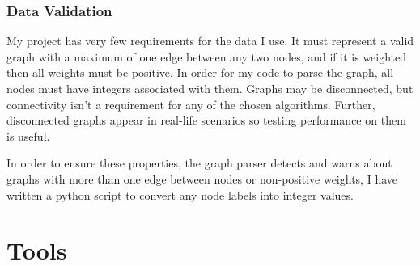 \documentclass[12pt,a4paper,twoside,openright]{report}
\begin{document}
	\subsubsection{Data Validation}
	My project has very few requirements for the data I use. It must represent a valid graph with a maximum of one edge between any two nodes, and if it is weighted then all weights must be positive. In order for my code to parse the graph, all nodes must have integers associated with them. Graphs may be disconnected, but connectivity isn't a requirement for any of the chosen algorithms. Further, disconnected graphs appear in real-life scenarios so testing performance on them is useful.
	
	In order to ensure these properties, the graph parser detects and warns about graphs with more than one edge between nodes or non-positive weights, I have written a python script to convert any node labels into integer values.
\section{Tools}
\end{document}
